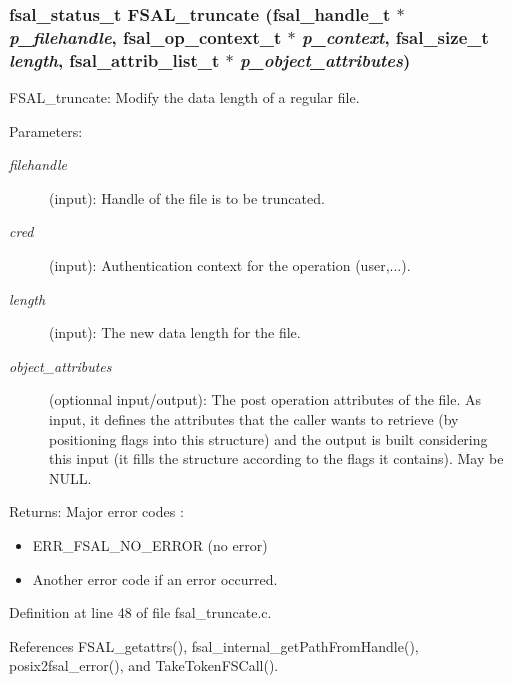 \subsubsection{\setlength{\rightskip}{0pt plus 5cm}fsal\_\-status\_\-t FSAL\_\-truncate (fsal\_\-handle\_\-t $\ast$ {\em p\_\-filehandle}, fsal\_\-op\_\-context\_\-t $\ast$ {\em p\_\-context}, fsal\_\-size\_\-t {\em length}, fsal\_\-attrib\_\-list\_\-t $\ast$ {\em p\_\-object\_\-attributes})}\label{fsal__truncate_8c_a0}


FSAL\_\-truncate: Modify the data length of a regular file.

\begin{Desc}
\item[Parameters:]
\begin{description}
\item[{\em filehandle}](input): Handle of the file is to be truncated. \item[{\em cred}](input): Authentication context for the operation (user,...). \item[{\em length}](input): The new data length for the file. \item[{\em object\_\-attributes}](optionnal input/output): The post operation attributes of the file. As input, it defines the attributes that the caller wants to retrieve (by positioning flags into this structure) and the output is built considering this input (it fills the structure according to the flags it contains). May be NULL.\end{description}
\end{Desc}
\begin{Desc}
\item[Returns:]Major error codes :\begin{itemize}
\item ERR\_\-FSAL\_\-NO\_\-ERROR (no error)\item Another error code if an error occurred. \end{itemize}
\end{Desc}


Definition at line 48 of file fsal\_\-truncate.c.

References FSAL\_\-getattrs(), fsal\_\-internal\_\-get\-Path\-From\-Handle(), posix2fsal\_\-error(), and Take\-Token\-FSCall().